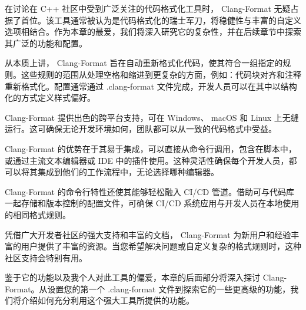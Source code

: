 在讨论在 C++ 社区中受到广泛关注的代码格式化工具时， Clang-Format 无疑占据了首位。该工具通常被认为是代码格式化的瑞士军刀，将稳健性与丰富的自定义选项相结合。作为本章的最爱，我们将深入研究它的复杂性，并在后续章节中探索其广泛的功能和配置。

从本质上讲， Clang-Format 旨在自动重新格式化代码，使其符合一组指定的规则。这些规则的范围从处理空格和缩进到更复杂的方面，例如：代码块对齐和注释重新格式化。配置通常通过 .clang-format 文件完成，开发人员可以在其中以结构化的方式定义样式偏好。

Clang-Format 提供出色的跨平台支持，可在 Windows、 macOS 和 Linux 上无缝运行。这可确保无论开发环境如何，团队都可以从一致的代码格式中受益。

Clang-Format 的优势在于其易于集成，可以直接从命令行调用，包含在脚本中，或通过主流文本编辑器或 IDE 中的插件使用。这种灵活性确保每个开发人员，都可以将其集成到他们的工作流程中，无论选择哪种编辑器。

Clang-Format 的命令行特性还使其能够轻松融入 CI/CD 管道。借助可与代码库一起存储和版本控制的配置文件，可确保 CI/CD 系统应用与开发人员在本地使用的相同格式规则。

凭借广大开发者社区的强大支持和丰富的文档， Clang-Format 为新用户和经验丰富的用户提供了丰富的资源。当您希望解决问题或自定义复杂的格式规则时，这种社区支持会特别有用。

鉴于它的功能以及我个人对此工具的偏爱，本章的后面部分将深入探讨 Clang-Format。从设置您的第一个 .clang-format 文件到探索它的一些更高级的功能，我们将介绍如何充分利用这个强大工具所提供的功能。

















